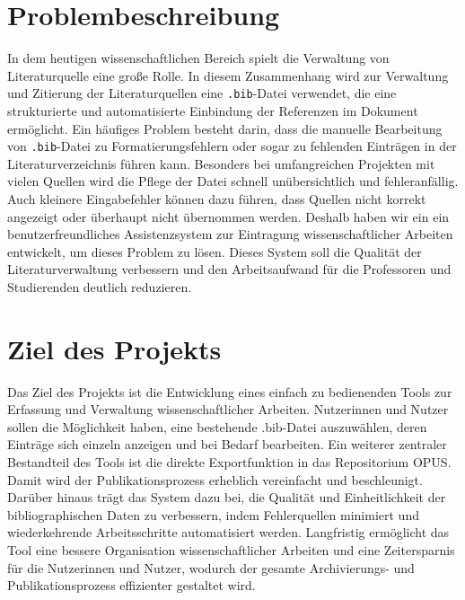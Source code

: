 \section{Problembeschreibung}
In dem  heutigen wissenschaftlichen Bereich spielt die Verwaltung von Literaturquelle eine große Rolle.
In diesem Zusammenhang wird zur Verwaltung und Zitierung der Literaturquellen eine \texttt{.bib}-Datei verwendet,
die eine strukturierte und automatisierte Einbindung der Referenzen im Dokument ermöglicht.
Ein häufiges Problem besteht darin, dass die manuelle Bearbeitung von \texttt{.bib}-Datei zu 
Formatierungsfehlern oder sogar zu fehlenden Einträgen in der Literaturverzeichnis führen kann.
Besonders bei umfangreichen Projekten mit vielen Quellen wird die Pflege der Datei schnell unübersichtlich und fehleranfällig.
Auch kleinere Eingabefehler können dazu führen, dass Quellen nicht korrekt angezeigt oder überhaupt nicht übernommen werden.
Deshalb haben wir ein ein benutzerfreundliches Assistenzsystem zur Eintragung wissenschaftlicher Arbeiten entwickelt, um dieses Problem zu lösen.
Dieses System soll die Qualität der Literaturverwaltung verbessern und den Arbeitsaufwand für die Professoren und 
Studierenden deutlich reduzieren.


\section{Ziel des Projekts}
Das Ziel des Projekts ist die Entwicklung eines einfach zu bedienenden 
Tools zur Erfassung und Verwaltung wissenschaftlicher Arbeiten. 
Nutzerinnen und Nutzer sollen die Möglichkeit haben, eine bestehende 
.bib-Datei auszuwählen, deren Einträge sich einzeln anzeigen und bei 
Bedarf bearbeiten. Ein weiterer zentraler Bestandteil des Tools ist die direkte Exportfunktion
in das Repositorium OPUS. Damit wird der Publikationsprozess erheblich 
vereinfacht und beschleunigt. Darüber hinaus trägt das System dazu bei, 
die Qualität und Einheitlichkeit der bibliographischen Daten zu verbessern,
indem Fehlerquellen minimiert und wiederkehrende Arbeitsschritte 
automatisiert werden. Langfristig ermöglicht das Tool eine bessere Organisation 
wissenschaftlicher Arbeiten und eine Zeitersparnis für die 
Nutzerinnen und Nutzer, wodurch der gesamte Archivierungs- und 
Publikationsprozess effizienter gestaltet wird.

